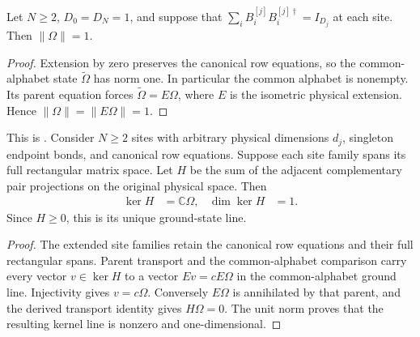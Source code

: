 \begin{lemma}
    \label{lem:varying_physical_scalar_state_normalized}
    \leanok
    Let $N\ge2$, $D_0=D_N=1$, and suppose that
    $\sum_iB^{[j]}_iB^{[j]\dagger}_i=I_{D_j}$ at each site. Then $\|\Omega\|=1$.
\end{lemma}
\begin{proof}\leanok
    Extension by zero preserves the canonical row equations, so the common-alphabet state $\widetilde\Omega$ has norm one. In particular the
    common alphabet is nonempty. Its parent equation forces
    $\widetilde\Omega=E\Omega$, where $E$ is the isometric physical extension.
    Hence $\|\Omega\|=\|E\Omega\|=1$.
\end{proof}

\begin{lemma}
    \label{lem:varying_physical_actual_parent_unique_line}
    \leanok
    This is \cite[Theorem~9]{PerezGarcia2007Matrix}. Consider $N\ge2$ sites
    with arbitrary physical dimensions $d_j$, singleton endpoint bonds, and
    canonical row equations. Suppose each site family
    spans its full rectangular matrix space. Let $H$ be the sum of the
    adjacent complementary pair projections on the original physical space.
    Then
    \begin{align}
        \ker H & =\mathbb C\Omega, & \dim\ker H & =1.
    \end{align}
    Since $H\ge0$, this is its unique ground-state line.
\end{lemma}
\begin{proof}\leanok
    The extended site families retain the canonical row equations and their
    full rectangular spans. Parent transport and the common-alphabet
    comparison carry every vector $v\in\ker H$ to a vector $Ev=cE\Omega$ in
    the common-alphabet ground line. Injectivity gives $v=c\Omega$.
    Conversely $E\Omega$ is annihilated by that parent, and the derived
    transport identity gives $H\Omega=0$. The unit norm proves that the
    resulting kernel line is nonzero and one-dimensional.
\end{proof}
